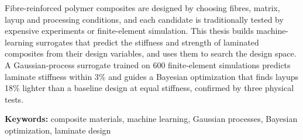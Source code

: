 Fibre-reinforced polymer composites are designed by choosing fibres, matrix, layup and
processing conditions, and each candidate is traditionally tested by expensive experiments or
finite-element simulation. This thesis builds machine-learning surrogates that predict the
stiffness and strength of laminated composites from their design variables, and uses them to
search the design space. A Gaussian-process surrogate trained on 600 finite-element simulations
predicts laminate stiffness within 3\% and guides a Bayesian optimization that finds layups 18\%
lighter than a baseline design at equal stiffness, confirmed by three physical tests.

\medskip\noindent\textbf{Keywords:} composite materials, machine learning, Gaussian processes,
Bayesian optimization, laminate design
